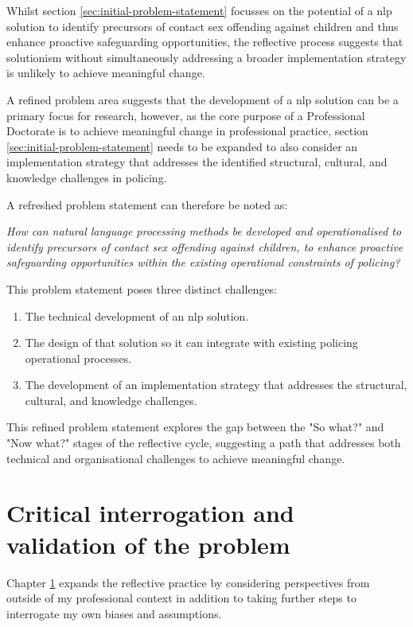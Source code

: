 \documentclass[12pt,a4paper,oneside]{report}
\begin{document}
Whilst section \ref{sec:initial-problem-statement} focusses on the potential of a \gls{nlp} solution to identify precursors of contact sex offending against children and thus enhance proactive safeguarding opportunities, the reflective process suggests that solutionism without simultaneously addressing a broader implementation strategy is unlikely to achieve meaningful change.

A refined problem area suggests that the development of a \gls{nlp} solution can be a primary focus for research, however, as the core purpose of a Professional Doctorate is to achieve meaningful change in professional practice, section \ref{sec:initial-problem-statement} needs to be expanded to also consider an implementation strategy that addresses the identified structural, cultural, and knowledge challenges in policing.

A refreshed problem statement can therefore be noted as:

\textit{How can natural language processing methods be developed and operationalised to identify precursors of contact sex offending against children, to enhance proactive safeguarding opportunities within the existing operational constraints of policing?}

This problem statement poses three distinct challenges:

\begin{enumerate}
    \item The technical development of an \gls{nlp} solution.
    \item The design of that solution so it can integrate with existing policing operational processes.
    \item The development of an implementation strategy that addresses the structural, cultural, and knowledge challenges.
\end{enumerate}

This refined problem statement explores the gap between the "So what?" and "Now what?" stages of the reflective cycle, suggesting a path that addresses both technical and organisational challenges to achieve meaningful change.  

\chapter{Critical interrogation and validation of the problem}  
\label{ch:critical-interrogation-and-validation-of-the-problem}
Chapter \ref{ch:critical-interrogation-and-validation-of-the-problem} expands the reflective practice by considering perspectives from outside of my professional context in addition to taking further steps to interrogate my own biases and assumptions.
\end{document}
